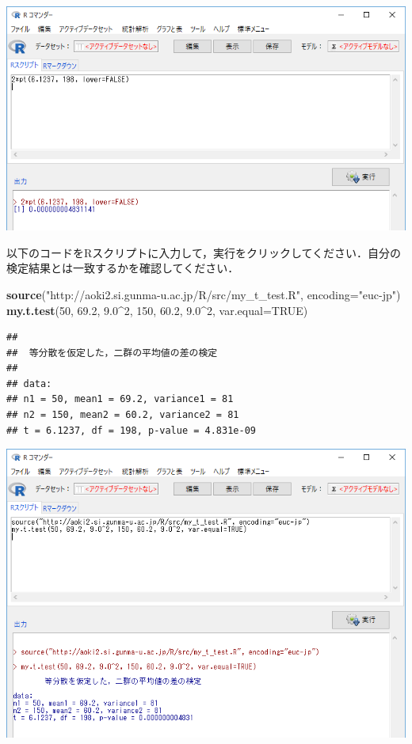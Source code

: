 \documentclass[11pt,]{problemset}
\newenvironment{Shaded}{\begin{snugshade}}{\end{snugshade}}
\newcommand{\DataTypeTok}[1]{\textcolor[rgb]{0.13,0.29,0.53}{#1}}
\newcommand{\DecValTok}[1]{\textcolor[rgb]{0.00,0.00,0.81}{#1}}
\newcommand{\FloatTok}[1]{\textcolor[rgb]{0.00,0.00,0.81}{#1}}
\newcommand{\KeywordTok}[1]{\textcolor[rgb]{0.13,0.29,0.53}{\textbf{#1}}}
\newcommand{\NormalTok}[1]{#1}
\newcommand{\OperatorTok}[1]{\textcolor[rgb]{0.81,0.36,0.00}{\textbf{#1}}}
\newcommand{\OtherTok}[1]{\textcolor[rgb]{0.56,0.35,0.01}{#1}}
\newcommand{\StringTok}[1]{\textcolor[rgb]{0.31,0.60,0.02}{#1}}
\begin{document}
\begin{center}\includegraphics[width=0.9\linewidth]{pic/tvaluepvalue00} \end{center}
\bigskip

\newpage
\vfill

以下のコードをRスクリプトに入力して，実行をクリックしてください．自分の検定結果とは一致するかを確認してください．

\begin{Shaded}
\begin{Highlighting}[]
\KeywordTok{source}\NormalTok{(}\StringTok{"http://aoki2.si.gunma-u.ac.jp/R/src/my_t_test.R"}\NormalTok{, }\DataTypeTok{encoding=}\StringTok{"euc-jp"}\NormalTok{)}
\KeywordTok{my.t.test}\NormalTok{(}\DecValTok{50}\NormalTok{, }\FloatTok{69.2}\NormalTok{, }\FloatTok{9.0}\OperatorTok{^}\DecValTok{2}\NormalTok{, }\DecValTok{150}\NormalTok{, }\FloatTok{60.2}\NormalTok{, }\FloatTok{9.0}\OperatorTok{^}\DecValTok{2}\NormalTok{, }\DataTypeTok{var.equal=}\OtherTok{TRUE}\NormalTok{)}
\end{Highlighting}
\end{Shaded}

\begin{verbatim}
## 
##  等分散を仮定した，二群の平均値の差の検定
## 
## data:  
## n1 = 50, mean1 = 69.2, variance1 = 81
## n2 = 150, mean2 = 60.2, variance2 = 81
## t = 6.1237, df = 198, p-value = 4.831e-09
\end{verbatim}

\begin{center}\includegraphics[width=0.9\linewidth]{pic/myttest01} \end{center}
\bigskip
\end{document}
